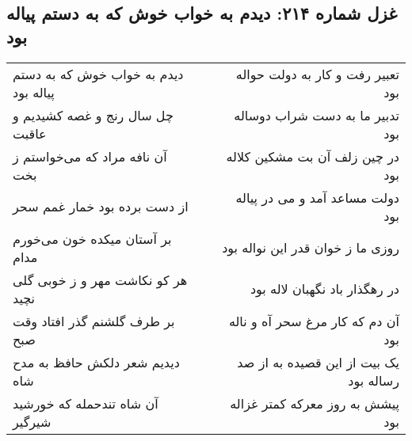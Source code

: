 \begin{center}
\section*{غزل شماره ۲۱۴: دیدم به خواب خوش که به دستم پیاله بود}
\label{sec:sh214}
\begin{longtable}{l p{0.5cm} r}
دیدم به خواب خوش که به دستم پیاله بود
&&
تعبیر رفت و کار به دولت حواله بود
\\
چل سال رنج و غصه کشیدیم و عاقبت
&&
تدبیر ما به دست شراب دوساله بود
\\
آن نافه مراد که می‌خواستم ز بخت
&&
در چین زلف آن بت مشکین کلاله بود
\\
از دست برده بود خمار غمم سحر
&&
دولت مساعد آمد و می در پیاله بود
\\
بر آستان میکده خون می‌خورم مدام
&&
روزی ما ز خوان قدر این نواله بود
\\
هر کو نکاشت مهر و ز خوبی گلی نچید
&&
در رهگذار باد نگهبان لاله بود
\\
بر طرف گلشنم گذر افتاد وقت صبح
&&
آن دم که کار مرغ سحر آه و ناله بود
\\
دیدیم شعر دلکش حافظ به مدح شاه
&&
یک بیت از این قصیده به از صد رساله بود
\\
آن شاه تندحمله که خورشید شیرگیر
&&
پیشش به روز معرکه کمتر غزاله بود
\\
\end{longtable}
\end{center}
